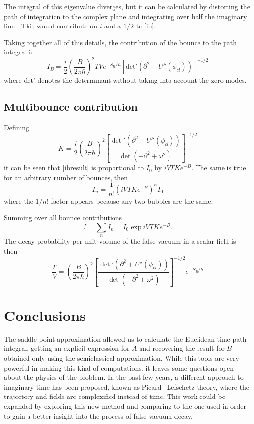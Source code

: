 \documentclass[a0,portrait]{a0poster}
\begin{document}
\begin{multicols}{3}
The integral of this eigenvalue diverges, but it can be calculated by distorting the path of integration to the complex plane and integrating over half the imaginary line \cite{callan}. This would contribute an $i$ and a $1/2$ to \cref{ib}.

Taking together all of this details, the contribution of the bounce to the path integral is 
\begin{equation}\label{ibresult}
I_B = \frac{i}{2} \left(\frac{B}{2\pi\hbar}\right)^2 TV  e^{-S_B /  \hbar}   \left[\textrm{det}'\left(\partial^2 + U''(\phi_{cl}) \right)\right]^{-1/2}
\end{equation}
where det' denotes the determinant without taking into account the zero modes. 

\subsection{Multibounce contribution}
Defining 
\begin{equation}
K = \frac{i}{2} \left(\frac{B}{2\pi\hbar}\right)^2 \left[ \frac{\det'\left(\partial^2 + U''(\phi_{cl}) \right)}{\det\left(-\partial^2 + \omega^2 \right)}\right]^{-1/2}
\end{equation}
it can be seen that \cref{ibresult} is proportional to $I_0$ by $iVTK e^{-B}$. The same is true for an arbitrary number of bounces, then
\begin{equation}
I_n = \frac{1}{n!} (iVTK e^{-B})^n I_0
\end{equation}
where the $1/n!$ factor appears because any two bubbles are the same. 

Summing over all bounce contributions 
\begin{equation}
I = \sum_n I_n = I_0 \exp{iVTKe^{-B}}.
\end{equation}
The decay probability per unit volume of the false vacuum in a scalar field is then 
\begin{equation}
\frac{\Gamma}{V} = \left(\frac{B}{2\pi\hbar}\right)^2 \left[ \frac{\det'\left(\partial^2 + U''(\phi_{cl}) \right)}{\det\left(-\partial^2 + \omega^2 \right)}\right]^{-1/2} e^{-S_B /  \hbar}
\end{equation}

\section{Conclusions}
The saddle point approximation allowed us to calculate the Euclidean time path integral, getting an explicit expression for $A$ and recovering the result for $B$ obtained only using the semiclassical approximation. While this tools are very powerful in making this kind of computations, it leaves some questions open about the physics of the problem. In the past few years, a different approach to imaginary time has been proposed, known as Picard$-$Lefschetz theory, where the trajectory and fields are complexified instead of time. This work could be expanded by exploring this new method and comparing to the one used in order to gain a better insight into the process of false vacuum decay.


\end{multicols}
\end{document}
